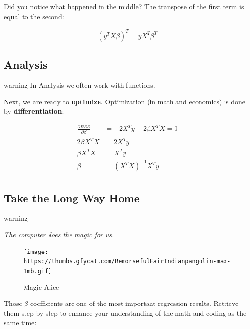 \documentclass[
]{book}
\begin{document}
Did you notice what happened in the middle? The transpose of the first term is equal to the second:

\[\begin{align}
    (y^T X \beta)^T = y X^T \beta^T
\end{align}\]

\hypertarget{analysis}{%
\subsection{Analysis}\label{analysis}}

\begin{infobox}warning
In Analysis we often work with functions.

\end{infobox}

Next, we are ready to \textbf{optimize}. Optimization (in math and economics) is done by \textbf{differentiation}:

\[\begin{align}
    \frac{\partial RSS}{\partial \beta} &= -2 X^T y + 2 \beta X^T X = 0 \tag{first derivative equal to zero} \\
    2 \beta X^T X &= 2 X^T y \tag{rearrange terms}\\
    \beta X^T X &= X^T y \tag{the "normal equation"} \\
    \beta &= (X^T X)^{-1} X^T y \tag{Bam}\\
\end{align}\]

\hypertarget{take-the-long-way-home}{%
\subsection{Take the Long Way Home}\label{take-the-long-way-home}}

\begin{infobox}warning

\emph{The computer does the magic for us.}

\begin{figure}
\centering
\texttt{[image: https://thumbs.gfycat.com/RemorsefulFairIndianpangolin-max-1mb.gif]}
\caption{Magic Alice}
\end{figure}

\end{infobox}

Those \(\beta\) coefficients are one of the most important regression results. Retrieve them step by step to enhance your understanding of the math and coding as the same time:
\end{document}
